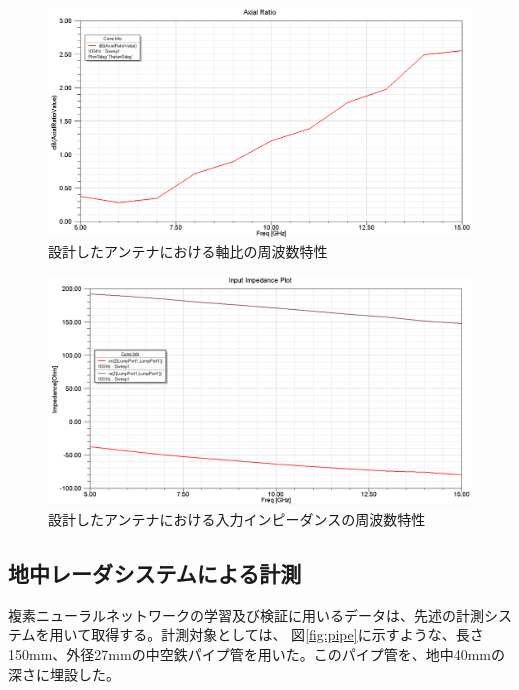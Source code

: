 \documentclass[11pt,a4paper,uplatex,draft]{ujarticle}
\begin{document}
  \begin{figure}[hbtp]
    \centering
    \includegraphics[keepaspectratio, width=130mm]{Images/axial_ratio.png}
    \caption{設計したアンテナにおける軸比の周波数特性}
    \label{fig:axial_ratio}
  \end{figure}

  \clearpage

  \begin{figure}[hbtp]
    \centering
    \includegraphics[keepaspectratio, width=130mm]{Images/spiral_impedance.png}
    \caption{設計したアンテナにおける入力インピーダンスの周波数特性}
    \label{fig:spiral_antenna_impedance}
  \end{figure}

\newpage

  \subsection{地中レーダシステムによる計測}
  複素ニューラルネットワークの学習及び検証に用いるデータは、先述の計測システムを用いて取得する。計測対象としては、
  図\ref{fig:pipe}に示すような、長さ150mm、外径27mmの中空鉄パイプ管を用いた。このパイプ管を、地中40mmの深さに埋設した。
\end{document}
